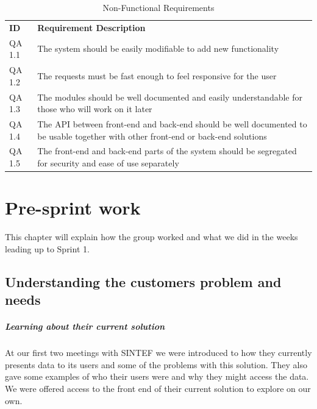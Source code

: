 \documentclass[11pt,a4paper,titlepage,oneside]{report}
\begin{document}
  \begin{longtable}{p{1.4cm} p{9.8cm} }
  \caption[Non-Functional Requirements]{Non-Functional Requirements} \label{nonFuncReqs} \\
  \hline
  \multicolumn{1}{p{1.4cm}}{\textbf{ID}} &
  \multicolumn{1}{p{9.8cm}}{\textbf{Requirement Description}}
  \endfirsthead

  \multicolumn{2}{r}{{Continued on next page}} \\
  \endfoot

  \hline \hline
  \endlastfoot

  \hline
  \gls{QA} 1.1 & The system should be easily modifiable to add new functionality\\ \hline

  \gls{QA} 1.2 & The requests must be fast enough to feel responsive for the user \\ \hline

  \gls{QA} 1.3 & The modules should be well documented and easily understandable for those who will work on it later \\ \hline

  \gls{QA} 1.4 & The API between front-end and back-end should be well documented to be usable together with other front-end or back-end solutions \\ \hline

  \gls{QA} 1.5 & The front-end and back-end parts of the system should be segregated for security and ease of use separately \\ \hline

  \end{longtable}


\chapter{Pre-sprint work}
This chapter will explain how the group worked and what we did in the weeks leading up to Sprint 1.

\section{Understanding the customers problem and needs}

\paragraph{Learning about their current solution}
At our first two meetings with SINTEF we were introduced to how they currently presents data to its users and some of the problems with this solution. They also gave some examples of who their users were and why they might access the data. We were offered access to the front end of their current solution to explore on our own.
\end{document}
